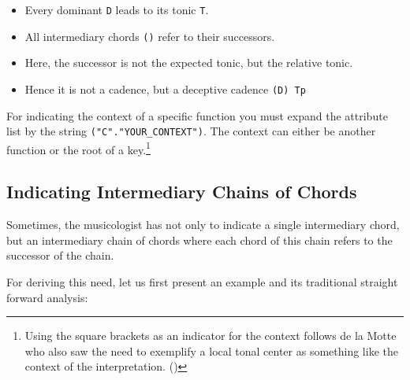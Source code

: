 \documentclass[
  DIV=calc,
  BCOR=5mm,
  12pt,
  headings=small,
  oneside,
  abstract=true,
  toc=bib,
  xcolor=dvipsnames,
  openany,
  english]{scrartcl}
\begin{document}
\begin{itemize}
  \item Every dominant \texttt{D} leads to its tonic \texttt{T}.
  \item All intermediary chords \texttt{()} refer to their successors.
  \item Here, the successor is not the expected tonic, but the relative tonic.
  \item Hence it is not a cadence, but a deceptive cadence \texttt{(D) Tp}
\end{itemize}

For indicating the context of a specific function you must expand the attribute
list by the string \texttt{("C"."YOUR\_CONTEXT")}. The context can either be
another function or the root of a key.\footnote{Using the square brackets as an
indicator for the context follows de la Motte who also saw the need to exemplify
a local tonal center as something like the context of the interpretation.
(\cite[cf.][144 et passim]{Delamotte2011a})}


\subsection{Indicating Intermediary Chains of Chords}

Sometimes, the musicologist has not only to indicate a single intermediary
chord, but an intermediary chain of chords where each chord of this chain
refers to the successor of the chain.

For deriving this need, let us first present an example and its traditional
straight forward analysis:

\begin{center}
\end{center}
\end{document}
